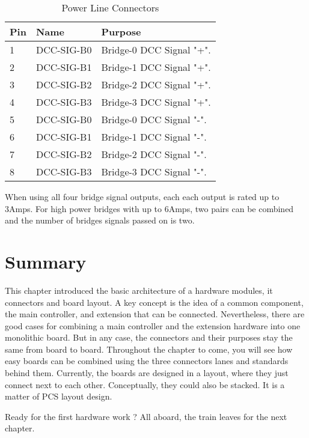 \begin{table}[h!]
    \begin{center}
        \caption{Power Line Connectors}
        \begin{tabular}{|l|l|p{}|}
            \toprule
            \textbf{Pin} & \textbf{Name} & \textbf{Purpose} \\
            \midrule
            1 & DCC-SIG-B0 & Bridge-0 DCC Signal "+". \\
            \midrule
            2 & DCC-SIG-B1 & Bridge-1 DCC Signal "+". \\
            \midrule
            3 & DCC-SIG-B2 & Bridge-2 DCC Signal "+". \\
            \midrule
            4 & DCC-SIG-B3 & Bridge-3 DCC Signal "+". \\
            \midrule
            5 & DCC-SIG-B0 & Bridge-0 DCC Signal "-". \\
            \midrule
            6 & DCC-SIG-B1 & Bridge-1 DCC Signal "-". \\
            \midrule
            7 & DCC-SIG-B2 & Bridge-2 DCC Signal "-". \\
            \midrule
            8 & DCC-SIG-B3 & Bridge-3 DCC Signal "-". \\
            \bottomrule
        \end{tabular}
    \end{center}
\end{table}

\FloatBarrier

When using all four bridge signal outputs, each each output is rated up to 3Amps. For high power bridges with up to 6Amps, two pairs can be combined and the number of bridges signals passed on is two.

\section{Summary}

This chapter introduced the basic architecture of a hardware modules, it connectors and board layout. A key concept is the idea of a common component, the main controller, and extension that can be connected. Nevertheless, there are good cases for combining a main controller and the extension hardware into one monolithic board. But in any case, the connectors and their purposes stay the same from board to board. Throughout the chapter to come, you will see how easy boards can be combined using the three connectors lanes and standards behind them. Currently, the boards are designed in a layout, where they just connect next to each other. Conceptually, they could also be stacked. It is a matter of PCS layout design.

Ready for the first hardware work ? All aboard, the train leaves for the next chapter.

